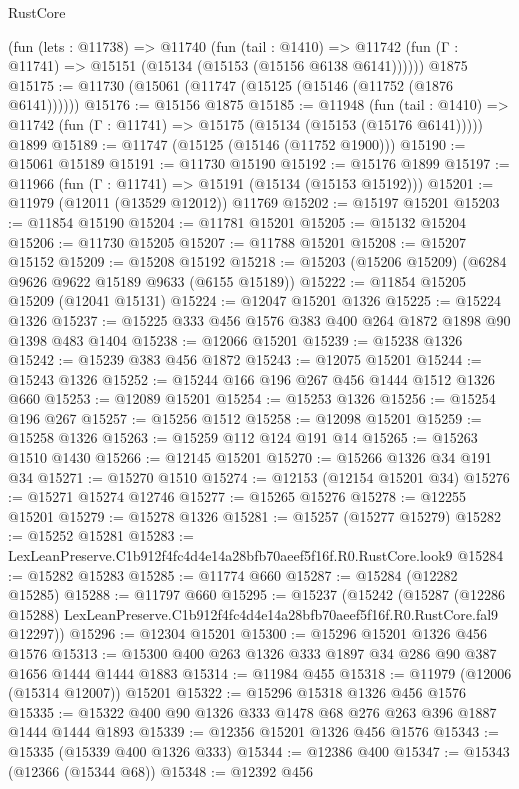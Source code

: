 \begin{lexlean}{RustCore}
\begin{coremodule}
    (fun (lets : @11738) =>
    @11740
      (fun (tail : @1410) =>
      @11742 (fun (Γ : @11741) => @15151 (@15134 (@15153 (@15156 @6138 @6141))))))
    @1875
@15175 := @11730 (@15061 (@11747 (@15125 (@15146 (@11752 (@1876 @6141))))))
@15176 := @15156 @1875
@15185 := @11948
    (fun (tail : @1410) => @11742 (fun (Γ : @11741) => @15175 (@15134 (@15153 (@15176 @6141)))))
    @1899
@15189 := @11747 (@15125 (@15146 (@11752 @1900)))
@15190 := @15061 @15189
@15191 := @11730 @15190
@15192 := @15176 @1899
@15197 := @11966 (fun (Γ : @11741) => @15191 (@15134 (@15153 @15192)))
@15201 := @11979 (@12011 (@13529 @12012)) @11769
@15202 := @15197 @15201
@15203 := @11854 @15190
@15204 := @11781 @15201
@15205 := @15132 @15204
@15206 := @11730 @15205
@15207 := @11788 @15201
@15208 := @15207 @15152
@15209 := @15208 @15192
@15218 := @15203 (@15206 @15209) (@6284 @9626 @9622 @15189 @9633 (@6155 @15189))
@15222 := @11854 @15205 @15209 (@12041 @15131)
@15224 := @12047 @15201 @1326
@15225 := @15224 @1326
@15237 := @15225 @333 @456 @1576 @383 @400 @264 @1872 @1898 @90 @1398 @483 @1404
@15238 := @12066 @15201
@15239 := @15238 @1326
@15242 := @15239 @383 @456 @1872
@15243 := @12075 @15201
@15244 := @15243 @1326
@15252 := @15244 @166 @196 @267 @456 @1444 @1512 @1326 @660
@15253 := @12089 @15201
@15254 := @15253 @1326
@15256 := @15254 @196 @267
@15257 := @15256 @1512
@15258 := @12098 @15201
@15259 := @15258 @1326
@15263 := @15259 @112 @124 @191 @14
@15265 := @15263 @1510 @1430
@15266 := @12145 @15201
@15270 := @15266 @1326 @34 @191 @34
@15271 := @15270 @1510
@15274 := @12153 (@12154 @15201 @34)
@15276 := @15271 @15274 @12746
@15277 := @15265 @15276
@15278 := @12255 @15201
@15279 := @15278 @1326
@15281 := @15257 (@15277 @15279)
@15282 := @15252 @15281
@15283 := LexLeanPreserve.C1b912f4fc4d4e14a28bfb70aeef5f16f.R0.RustCore.look9
@15284 := @15282 @15283
@15285 := @11774 @660
@15287 := @15284 (@12282 @15285)
@15288 := @11797 @660
@15295 := @15237
    (@15242
      (@15287
        (@12286 @15288)
        LexLeanPreserve.C1b912f4fc4d4e14a28bfb70aeef5f16f.R0.RustCore.fal9
        @12297))
@15296 := @12304 @15201
@15300 := @15296 @15201 @1326 @456 @1576
@15313 := @15300 @400 @263 @1326 @333 @1897 @34 @286 @90 @387 @1656 @1444 @1444 @1883
@15314 := @11984 @455
@15318 := @11979 (@12006 (@15314 @12007)) @15201
@15322 := @15296 @15318 @1326 @456 @1576
@15335 := @15322 @400 @90 @1326 @333 @1478 @68 @276 @263 @396 @1887 @1444 @1444 @1893
@15339 := @12356 @15201 @1326 @456 @1576
@15343 := @15335 (@15339 @400 @1326 @333)
@15344 := @12386 @400
@15347 := @15343 (@12366 (@15344 @68))
@15348 := @12392 @456

\end{coremodule}
\end{lexlean}
